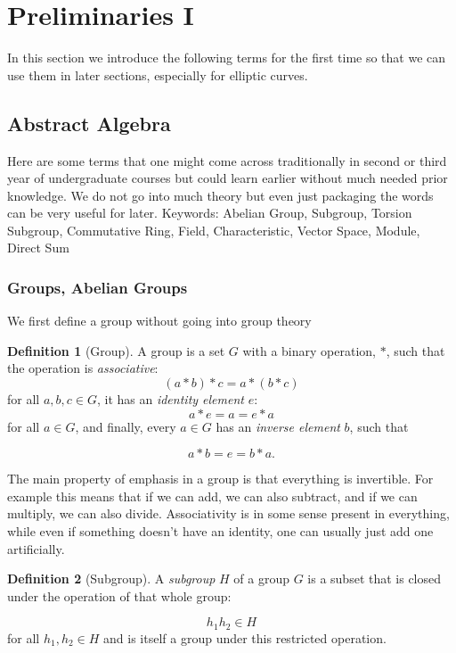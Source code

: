 \documentclass{article}
\theoremstyle{definition}
\newtheorem{definition}{Definition}[section]
\theoremstyle{definition}
\theoremstyle{definition}
\begin{document}
\section{Preliminaries I}
In this section we introduce the following terms for the first time so that we can use them in later sections, especially for elliptic curves.



\subsection{Abstract Algebra}
Here are some terms that one might come across traditionally in second or third year of undergraduate courses but could learn earlier without much needed prior knowledge. We do not go into much theory but even just packaging the words can be very useful for later.
\newline\newline
Keywords: Abelian Group, Subgroup, Torsion Subgroup, Commutative Ring, Field, Characteristic, Vector Space, Module, Direct Sum  

\subsubsection{Groups, Abelian Groups}
We first define a group without going into group theory

\begin{definition} [Group]
    A group is a set $G$ with a binary operation, $*$, such that the operation is \emph{associative}:
    $$(a*b)*c=a*(b*c)$$
    for all $a,b,c\in G$, it has an \emph{identity element} $e$:
    $$a*e=a=e*a$$ 
    for all $a\in G$, and finally, every $a\in G$ has an \emph{inverse element} $b$, such that
    
    $$a*b=e=b*a.$$ 
\end{definition}
The main property of emphasis in a group is that everything is invertible. For example this means that if we can add, we can also subtract, and if we can multiply, we can also divide. Associativity is in some sense present in everything, while even if something doesn't have an identity, one can usually just add one artificially.


\begin{definition}[Subgroup]
    A \emph{subgroup} $H$ of a group $G$ is a subset that is closed under the operation of that whole group:

    $$h_1h_2\in H$$
for all $h_1,h_2\in H$ and is itself a group under this restricted operation.

\end{definition}
\end{document}
